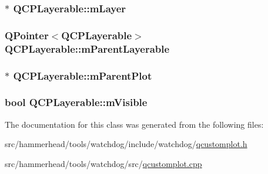\subsubsection[{\texorpdfstring{m\+Layer}{mLayer}}]{$\ast$ Q\+C\+P\+Layerable\+::m\+Layer\hspace{0.3cm}{\ttfamily [protected]}}\hypertarget{classQCPLayerable_aa38ec5891aff0f50b36fd63e9372a0cd}{}\label{classQCPLayerable_aa38ec5891aff0f50b36fd63e9372a0cd}
\subsubsection[{\texorpdfstring{m\+Parent\+Layerable}{mParentLayerable}}]{\setlength{\rightskip}{0pt plus 5cm}Q\+Pointer$<${\bf Q\+C\+P\+Layerable}$>$ Q\+C\+P\+Layerable\+::m\+Parent\+Layerable\hspace{0.3cm}{\ttfamily [protected]}}\hypertarget{classQCPLayerable_a3291445a980053e2d17a21d15957624e}{}\label{classQCPLayerable_a3291445a980053e2d17a21d15957624e}
\subsubsection[{\texorpdfstring{m\+Parent\+Plot}{mParentPlot}}]{$\ast$ Q\+C\+P\+Layerable\+::m\+Parent\+Plot\hspace{0.3cm}{\ttfamily [protected]}}\hypertarget{classQCPLayerable_aa2a528433e44db02b8aef23c1f9f90ed}{}\label{classQCPLayerable_aa2a528433e44db02b8aef23c1f9f90ed}
\subsubsection[{\texorpdfstring{m\+Visible}{mVisible}}]{\setlength{\rightskip}{0pt plus 5cm}bool Q\+C\+P\+Layerable\+::m\+Visible\hspace{0.3cm}{\ttfamily [protected]}}\hypertarget{classQCPLayerable_a62e3aed8427d6ce3ccf716f285106cb3}{}\label{classQCPLayerable_a62e3aed8427d6ce3ccf716f285106cb3}


The documentation for this class was generated from the following files\+:\begin{DoxyCompactItemize}
\item 
src/hammerhead/tools/watchdog/include/watchdog/\hyperlink{qcustomplot_8h}{qcustomplot.\+h}\item 
src/hammerhead/tools/watchdog/src/\hyperlink{qcustomplot_8cpp}{qcustomplot.\+cpp}\end{DoxyCompactItemize}
